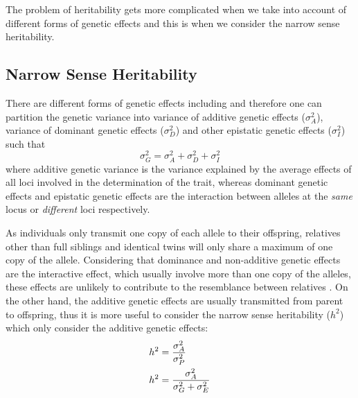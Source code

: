 	The problem of heritability gets more complicated when we take into account of different forms of genetic effects and this is when we consider the narrow sense heritability.
	
	\subsection{Narrow Sense Heritability}
	There are different forms of genetic effects including and therefore one can partition the genetic variance into variance of additive genetic effects ($\sigma_A^2$), variance of dominant genetic effects ($\sigma_D^2$) and other epistatic genetic effects ($\sigma_I^2$) such that
	$$
	\sigma_G^2=\sigma_A^2+\sigma_D^2+\sigma_I^2
	$$
	where additive genetic variance is the variance explained by the average effects of all loci involved in the determination of the trait, whereas dominant genetic effects and epistatic genetic effects are the interaction between alleles at the \emph{same} locus or \emph{different} loci respectively.
	
	As individuals only transmit one copy of each allele to their offspring, relatives other than full siblings and identical twins will only share a maximum of one copy of the allele.
	Considering that dominance and non-additive genetic effects are the interactive effect, which usually involve more than one copy of the alleles, these effects are unlikely to contribute to the resemblance between relatives \citep{Visscher2008}.
	On the other hand, the additive genetic effects are usually transmitted from parent to offspring, thus it is more useful to consider the narrow sense heritability ($h^2$) which only consider the additive genetic effects:
	\begin{align}
	h^2&=\frac{\sigma_A^2}{\sigma_P^2} \notag\\
	h^2&=\frac{\sigma_A^2}{\sigma_G^2+\sigma_E^2}
	\label{eq:narrowHeritability}
	\end{align}
	
